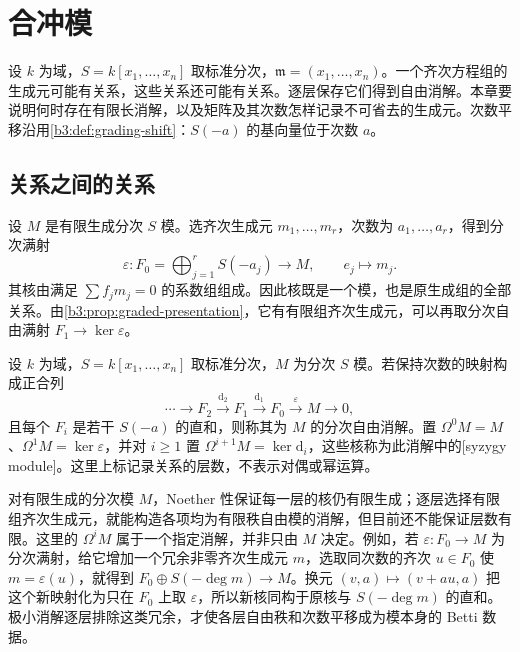 
\section{合冲模}
\label{b3:sec:2101}


%
%
%

设 \(k\) 为域，\(S=k[x_1,\ldots,x_n]\) 取标准分次，\(\mathfrak m=(x_1,\ldots,x_n)\)。一个齐次方程组的生成元可能有关系，这些关系还可能有关系。逐层保存它们得到自由消解。本章要说明何时存在有限长消解，以及矩阵及其次数怎样记录不可省去的生成元。次数平移沿用\cref{b3:def:grading-shift}：\(S(-a)\) 的基向量位于次数 \(a\)。

\subsection{关系之间的关系}
\label{b3:subsec:2101:01}

设 \(M\) 是有限生成分次 \(S\) 模。选齐次生成元 \(m_1,\ldots,m_r\)，次数为 \(a_1,\ldots,a_r\)，得到分次满射
\[
	\varepsilon:F_0=\bigoplus_{j=1}^rS(-a_j)\longrightarrow M, \qquad e_j\longmapsto m_j.
\]
其核由满足 \(\sum f_jm_j=0\) 的系数组组成。因此核既是一个模，也是原生成组的全部关系。由\cref{b3:prop:graded-presentation}，它有有限组齐次生成元，可以再取分次自由满射 \(F_1\rightarrow\ker\varepsilon\)。

\begin{definition}\label{b3:def:graded-syzygy-resolution}
	设 \(k\) 为域，\(S=k[x_1,\ldots,x_n]\) 取标准分次，\(M\) 为分次 \(S\) 模。若保持次数的映射构成正合列
	\[
		\cdots\longrightarrow F_2\xrightarrow{\mathrm{d}_2}F_1 \xrightarrow{\mathrm{d}_1}F_0\xrightarrow{\varepsilon}M\longrightarrow0,
	\]
	且每个 \(F_i\) 是若干 \(S(-a)\) 的直和，则称其为 \(M\) 的分次自由消解。置 \(\Omega^0M=M\)、\(\Omega^1M=\ker\varepsilon\)，并对 \(i\ge1\) 置 \(\Omega^{i+1}M=\ker \mathrm{d}_i\)，这些核称为此消解中的[syzygy module]。这里上标记录关系的层数，不表示对偶或幂运算。
\end{definition}

对有限生成的分次模 \(M\)，Noether 性保证每一层的核仍有限生成；逐层选择有限组齐次生成元，就能构造各项均为有限秩自由模的消解，但目前还不能保证层数有限。这里的 \(\Omega^iM\) 属于一个指定消解，并非只由 \(M\) 决定。例如，若 \(\varepsilon:F_0\to M\) 为分次满射，给它增加一个冗余非零齐次生成元 \(m\)，选取同次数的齐次 \(u\in F_0\) 使 \(m=\varepsilon(u)\)，就得到 \(F_0\oplus S(-\deg m)\to M\)。换元 \((v,a)\mapsto(v+au,a)\) 把这个新映射化为只在 \(F_0\) 上取 \(\varepsilon\)，所以新核同构于原核与 \(S(-\deg m)\) 的直和。极小消解逐层排除这类冗余，才使各层自由秩和次数平移成为模本身的 Betti 数据。

